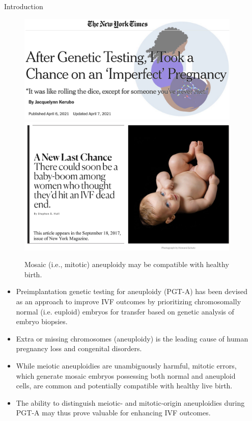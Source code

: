 \documentclass[final]{beamer}
\newlength{\sepwidth}
\newlength{\colwidth}
\newcommand{\separatorcolumn}{\begin{column}{\sepwidth}\end{column}}
\begin{document}
\begin{frame}[t]
\begin{columns}[t]
\separatorcolumn

\begin{column}{\colwidth}

  \begin{block}{Introduction}

    \begin{figure}
      \centering
     \includegraphics[width=0.45\linewidth,align=c]{figures/new_york.pdf}\hspace{1cm}
     \includegraphics[width=0.45\linewidth,align=c]{figures/nymag.pdf}

      \caption{Mosaic (i.e., mitotic) aneuploidy may be compatible with healthy birth.}
    \end{figure}
    
\begin{itemize}
     \item Preimplantation genetic testing for aneuploidy (PGT-A) has been devised as an approach to improve IVF outcomes by prioritizing chromosomally normal (i.e. euploid) embryos for transfer based on genetic analysis of embryo biopsies.
     
\item Extra or missing chromosomes (aneuploidy) is the leading cause of human pregnancy loss and congenital disorders. 

\item While meiotic aneuploidies are unambiguously harmful, mitotic errors, which generate mosaic embryos possessing both normal and aneuploid cells, are common and potentially compatible with healthy live birth. 

\item The ability to distinguish meiotic- and mitotic-origin aneuploidies during PGT-A may thus prove valuable for enhancing IVF outcomes.
\end{itemize}


\end{block}
\end{column}
\end{columns}
\end{frame}
\end{document}
